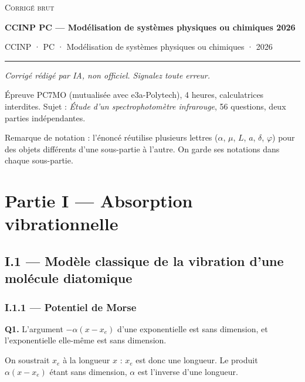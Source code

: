 \documentclass[11pt,a4paper]{article}
\begin{document}
\thispagestyle{plain}
\begin{center}
  {\small\scshape Corrigé brut}\par\smallskip
  {\LARGE\bfseries CCINP PC — Modélisation de systèmes physiques ou chimiques 2026\par}\medskip
  {\large CCINP · PC · Modélisation de systèmes physiques ou chimiques · 2026\par}
\end{center}
\vspace{2pt}\hrule\vspace{8pt}

\emph{Corrigé rédigé par IA, non officiel. Signalez toute erreur.}

Épreuve PC7MO (mutualisée avec e3a-Polytech), 4 heures, calculatrices interdites. Sujet : \emph{Étude d'un spectrophotomètre infrarouge}, 56 questions, deux parties indépendantes.

Remarque de notation : l'énoncé réutilise plusieurs lettres (\(\alpha\), \(\mu\), \(L\), \(a\), \(\delta\), \(\varphi\)) pour des objets différents d'une sous-partie à l'autre. On garde ses notations dans chaque sous-partie.

\hypertarget{partie-i-absorption-vibrationnelle}{%
\section{Partie I --- Absorption vibrationnelle}\label{partie-i-absorption-vibrationnelle}}

\hypertarget{i.1-moduxe8le-classique-de-la-vibration-dune-moluxe9cule-diatomique}{%
\subsection{I.1 --- Modèle classique de la vibration d'une molécule diatomique}\label{i.1-moduxe8le-classique-de-la-vibration-dune-moluxe9cule-diatomique}}

\hypertarget{i.1.1-potentiel-de-morse}{%
\subsubsection{I.1.1 --- Potentiel de Morse}\label{i.1.1-potentiel-de-morse}}

\textbf{Q1.} L'argument \(-\alpha(x-x_e)\) d'une exponentielle est sans dimension, et l'exponentielle elle-même est sans dimension.

On soustrait \(x_e\) à la longueur \(x\) : \(x_e\) est donc une longueur. Le produit \(\alpha(x-x_e)\) étant sans dimension, \(\alpha\) est l'inverse d'une longueur.
\end{document}
